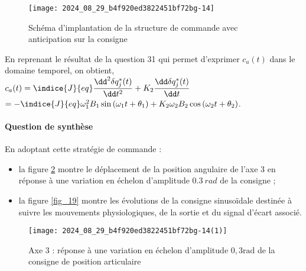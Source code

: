 \begin{figure}[!h]
\centering
\texttt{[image: 2024\_08\_29\_b4f920ed3822451bf72bg-14]}
\caption{\label{fig_17} Schéma d'implantation de la structure de commande avec anticipation sur la consigne}
\end{figure}

\ifprof
\begin{corrige}
En reprenant le résultat de la question 31 qui permet d'exprimer $c_a(t)$ dans le domaine temporel, on obtient, $
c_a(t)=\indice{J}{eq}\dfrac{\dd ^2\delta q^*_j(t)}{\dd t^2}+K_{2}\dfrac{\dd \delta q^*_j(t)}{\dd t}$
$=-\indice{J}{eq}\omega_1^2B_1\sin\left(\omega_1t+\theta_1\right)+K_2\omega_2B_2\cos\left(\omega_2t+\theta_2\right)
$.
\end{corrige}
\else
\fi


\paragraph*{Question de synthèse}
\ifprof
\else
En adoptant cette stratégie de commande :
\begin{itemize}
  \item la figure \ref{fig_18} montre le déplacement de la position angulaire de l'axe 3 en réponse à une variation en échelon d'amplitude $\SI{0,3}{rad}$ de la consigne ;
  \item la figure \ref{fig_19} montre les évolutions de la consigne sinusoïdale destinée à suivre les mouvements physiologiques, de la sortie et du signal d'écart associé.
\end{itemize}

\begin{figure}[!h]
\centering
\texttt{[image: 2024\_08\_29\_b4f920ed3822451bf72bg-14(1)]}

\caption{\label{fig_18} Axe 3 : réponse à une variation en échelon d'amplitude $0,3 \mathrm{rad}$ de la consigne de position articulaire}
\end{figure}
\fi 

